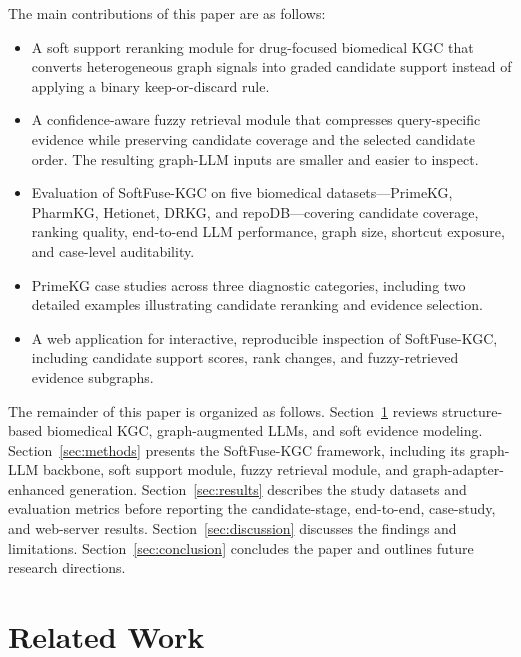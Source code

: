 \documentclass[pdflatex,sn-mathphys-num]{sn-jnl}
\newcommand{\softfuse}{SoftFuse-KGC}
\begin{document}
The main contributions of this paper are as follows:
\begin{itemize}
\item A soft support reranking module for drug-focused biomedical KGC that converts heterogeneous graph signals into graded candidate support instead of applying a binary keep-or-discard rule.
\item A confidence-aware fuzzy retrieval module that compresses query-specific evidence while preserving candidate coverage and the selected candidate order. The resulting graph-LLM inputs are smaller and easier to inspect.
\item Evaluation of \softfuse{} on five biomedical datasets---PrimeKG, PharmKG, Hetionet, DRKG, and repoDB---covering candidate coverage, ranking quality, end-to-end LLM performance, graph size, shortcut exposure, and case-level auditability. 
\item PrimeKG case studies across three diagnostic categories, including two detailed examples illustrating candidate reranking and evidence selection.
\item A web application for interactive, reproducible inspection of \softfuse{}, including candidate support scores, rank changes, and fuzzy-retrieved evidence subgraphs.
\end{itemize}

The remainder of this paper is organized as follows. Section~\ref{sec:related} reviews structure-based biomedical KGC, graph-augmented LLMs, and soft evidence modeling. Section~\ref{sec:methods} presents the \softfuse{} framework, including its graph-LLM backbone, soft support module, fuzzy retrieval module, and graph-adapter-enhanced generation. Section~\ref{sec:results} describes the study datasets and evaluation metrics before reporting the candidate-stage, end-to-end, case-study, and web-server results. Section~\ref{sec:discussion} discusses the findings and limitations. Section~\ref{sec:conclusion} concludes the paper and outlines future research directions.



\section{Related Work}
\label{sec:related}
\end{document}
